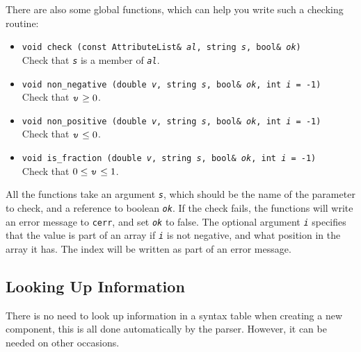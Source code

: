 \documentclass{article}
\newcommand{\code}[1]{\texttt{#1}}
\begin{document}
There are also some global functions, which can help you write such a
checking routine:
\begin{itemize}
\item \code{void check (const AttributeList\& \textit{al},
    string \textit{s}, bool\& \textit{ok})}\\
  Check that \texttt{\textit{s}} is a member of \texttt{\textit{al}}. 
\item \code{void non\_negative (double \textit{v},
    string \textit{s}, bool\& \textit{ok}, int \textit{i} = -1)}\\
  Check that $\texttt{\textit{v}}\geq{}0$.
\item \code{void non\_positive (double \textit{v},
    string \textit{s}, bool\& \textit{ok}, int \textit{i} = -1)}\\
  Check that $\texttt{\textit{v}}\leq{}0$.
\item \code{void is\_fraction (double \textit{v},
    string \textit{s}, bool\& \textit{ok}, int \textit{i} = -1)}\\
  Check that $0\leq{}\texttt{\textit{v}}\leq{}1$.
\end{itemize}

All the functions take an argument \texttt{\textit{s}}, which should
be the name of the parameter to check, and a reference to boolean
\texttt{\textit{ok}}.  If the check fails, the functions will write an
error message to \code{cerr}, and set \texttt{\textit{ok}} to false.
The optional argument \texttt{\textit{i}} specifies that the value is
part of an array if \texttt{\textit{i}} is not negative, and what
position in the array it has.  The index will be written as part of an
error message.

\subsection{Looking Up Information }

There is no need to look up information in a syntax table when
creating a new component, this is all done automatically by the
parser.  However, it can be needed on other occasions.  
\end{document}
